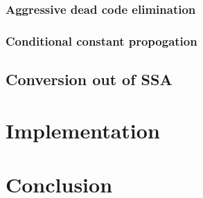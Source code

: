 \documentclass[a4paper,10pt]{report}
\begin{document}
\subsection{Aggressive dead code elimination}


\subsection{Conditional constant propogation}


\section{Conversion out of SSA}


\chapter{Implementation}


\chapter{Conclusion}
\end{document}
